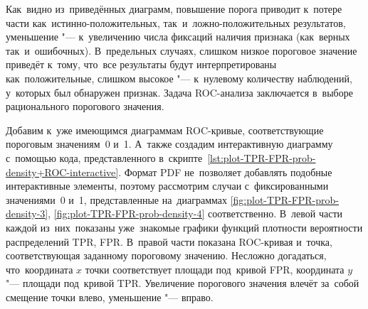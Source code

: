 \documentclass[]{scrreprt}
\begin{document}
Как~видно из~приведённых диаграмм, повышение порога приводит к~потере части как~истинно-положительных, так~и~ложно-положительных результатов, уменьшение "--- к~увеличению числа фиксаций наличия признака (как~верных так~и~ошибочных). В~предельных случаях, слишком низкое пороговое значение приведёт к~тому, что~все результаты будут интерпретированы как~положительные, слишком высокое "--- к~нулевому количеству наблюдений, у~которых был обнаружен признак. Задача ROC-анализа заключается в~выборе рационального порогового значения.

Добавим к~уже имеющимся диаграммам ROC-кривые, соответствующие пороговым значениям~0 и~1. А~также создадим интерактивную диаграмму с~помощью кода, представленного в~скрипте~\ref{lst:plot-TPR-FPR-prob-density+ROC-interactive}. Формат PDF не~позволяет добавлять подобные интерактивные элементы, поэтому рассмотрим случаи с~фиксированными значениями~0 и~1, представленные на~диаграммах \ref{fig:plot-TPR-FPR-prob-density-3}, \ref{fig:plot-TPR-FPR-prob-density-4} соответственно. В~левой части каждой из~них~показаны уже~знакомые графики функций плотности вероятности распределений TPR, FPR. В~правой части показана ROC-кривая и~точка, соответствующая заданному пороговому значению. Несложно догадаться, что~координата $x$ точки соответствует площади под~кривой FPR, координата $y$ "--- площади под~кривой TPR. Увеличение порогового значения влечёт за~собой смещение точки влево, уменьшение "--- вправо.
\end{document}
